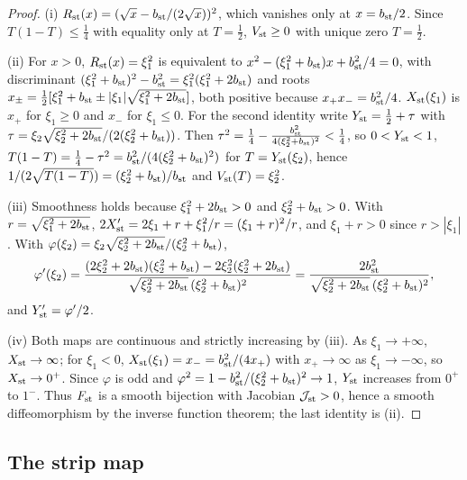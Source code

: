 \begin{proof}
(i) $R_{\rm st}(x)=(\sqrt x-b_{\rm st}/(2\sqrt x))^2$, which vanishes only at $x=b_{\rm st}/2$. Since $T(1-T)\le\frac14$ with
equality only at $T=\frac12$, $V_{\rm st}\ge0$ with unique zero $T=\frac12$.

(ii) For $x>0$, $R_{\rm st}(x)=\xi_1^2$ is equivalent to $x^2-(\xi_1^2+b_{\rm st})x+b_{\rm st}^2/4=0$, with discriminant
$(\xi_1^2+b_{\rm st})^2-b_{\rm st}^2=\xi_1^2(\xi_1^2+2b_{\rm st})$ and roots
$x_\pm=\frac12[\xi_1^2+b_{\rm st}\pm|\xi_1|\sqrt{\xi_1^2+2b_{\rm st}}]$, both positive because $x_+x_-=b_{\rm st}^2/4$.
$X_{\rm st}(\xi_1)$ is $x_+$ for $\xi_1\ge0$ and $x_-$ for $\xi_1\le0$. For the second identity write $Y_{\rm st}=\frac12+\tau$
with $\tau=\xi_2\sqrt{\xi_2^2+2b_{\rm st}}/(2(\xi_2^2+b_{\rm st}))$. Then
$\tau^2=\frac14-\frac{b_{\rm st}^2}{4(\xi_2^2+b_{\rm st})^2}<\frac14$, so $0<Y_{\rm st}<1$,
$T(1-T)=\frac14-\tau^2=b_{\rm st}^2/(4(\xi_2^2+b_{\rm st})^2)$ for $T=Y_{\rm st}(\xi_2)$, hence
$1/(2\sqrt{T(1-T)})=(\xi_2^2+b_{\rm st})/b_{\rm st}$ and $V_{\rm st}(T)=\xi_2^2$.

(iii) Smoothness holds because $\xi_1^2+2b_{\rm st}>0$ and $\xi_2^2+b_{\rm st}>0$. With $r=\sqrt{\xi_1^2+2b_{\rm st}}$,
$2X_{\rm st}'=2\xi_1+r+\xi_1^2/r=(\xi_1+r)^2/r$, and $\xi_1+r>0$ since $r>|\xi_1|$. With
$\varphi(\xi_2)=\xi_2\sqrt{\xi_2^2+2b_{\rm st}}/(\xi_2^2+b_{\rm st})$,
\[
 \varphi'(\xi_2)=\frac{(2\xi_2^2+2b_{\rm st})(\xi_2^2+b_{\rm st})-2\xi_2^2(\xi_2^2+2b_{\rm st})}
 {\sqrt{\xi_2^2+2b_{\rm st}}\,(\xi_2^2+b_{\rm st})^2}
 =\frac{2b_{\rm st}^2}{\sqrt{\xi_2^2+2b_{\rm st}}\,(\xi_2^2+b_{\rm st})^2},
\]
and $Y_{\rm st}'=\varphi'/2$.

(iv) Both maps are continuous and strictly increasing by (iii). As $\xi_1\to+\infty$, $X_{\rm st}\to\infty$; for $\xi_1<0$,
$X_{\rm st}(\xi_1)=x_-=b_{\rm st}^2/(4x_+)$ with $x_+\to\infty$ as $\xi_1\to-\infty$, so $X_{\rm st}\to0^+$. Since $\varphi$ is odd
and $\varphi^2=1-b_{\rm st}^2/(\xi_2^2+b_{\rm st})^2\to1$, $Y_{\rm st}$ increases from $0^+$ to $1^-$. Thus $F_{\rm st}$ is a
smooth bijection with Jacobian $\mathcal J_{\rm st}>0$, hence a smooth diffeomorphism by the inverse function theorem;
the last identity is (ii).
\end{proof}

\subsection{The strip map}\label{sec:str-map}

